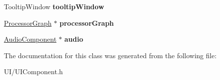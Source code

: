 \begin{DoxyCompactItemize}
\item 
\hypertarget{classUIComponent_aada41b9c0296382931f51a455b7748fb}{Tooltip\-Window {\bfseries tooltip\-Window}}\label{classUIComponent_aada41b9c0296382931f51a455b7748fb}

\item 
\hypertarget{classUIComponent_a677e808911329a5e9c302ce66686950e}{\hyperlink{classProcessorGraph}{Processor\-Graph} $\ast$ {\bfseries processor\-Graph}}\label{classUIComponent_a677e808911329a5e9c302ce66686950e}

\item 
\hypertarget{classUIComponent_a9545ca4f43092f5b20523da9f12c1395}{\hyperlink{classAudioComponent}{Audio\-Component} $\ast$ {\bfseries audio}}\label{classUIComponent_a9545ca4f43092f5b20523da9f12c1395}

\end{DoxyCompactItemize}


The documentation for this class was generated from the following file\-:\begin{DoxyCompactItemize}
\item 
U\-I/U\-I\-Component.\-h\end{DoxyCompactItemize}
